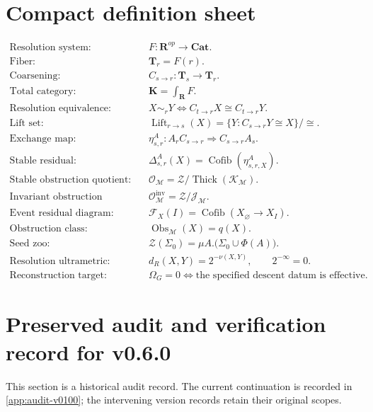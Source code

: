 \documentclass[11pt]{article}
\theoremstyle{definition}
\theoremstyle{remark}
\newcommand{\K}{\mathbf K}
\newcommand{\Rcat}{\mathbf R}
\newcommand{\Tcat}{\mathbf T}
\newcommand{\Cat}{\mathbf{Cat}}
\newcommand{\Lift}{\operatorname{Lift}}
\newcommand{\Cofib}{\operatorname{Cofib}}
\newcommand{\Obs}{\operatorname{Obs}}
\newcommand{\Zoo}{\mathcal Z}
\newcommand{\Seeds}{\Sigma}
\begin{document}
\appendix
{}
\section{Compact definition sheet}

\begin{align*}
\text{Resolution system:}\quad
&F:\Rcat^{op}\to\Cat.\\[0.4em]
\text{Fiber:}\quad
&\Tcat_r=F(r).\\[0.4em]
\text{Coarsening:}\quad
&C_{s\to r}:\Tcat_s\to\Tcat_r.\\[0.4em]
\text{Total category:}\quad
&\K=\int_{\Rcat}F.\\[0.4em]
\text{Resolution equivalence:}\quad
&X\sim_rY\iff C_{t\to r}X\cong C_{t\to r}Y.\\[0.4em]
\text{Lift set:}\quad
&\Lift_{r\to s}(X)=\{Y:C_{s\to r}Y\cong X\}/\cong.\\[0.4em]
\text{Exchange map:}\quad
&\eta^A_{s,r}:A_rC_{s\to r}\Rightarrow C_{s\to r}A_s.\\[0.4em]
\text{Stable residual:}\quad
&\Delta^A_{s,r}(X)=\Cofib(\eta^A_{s,r,X}).\\[0.4em]
\text{Stable obstruction quotient:}\quad
&\mathcal O_{\mathscr M}=\mathcal Z/\operatorname{Thick}(\mathcal K_{\mathscr M}).\\[0.4em]
\text{Invariant obstruction quotient:}\quad
&\mathcal O^{\mathrm{inv}}_{\mathscr M}=\mathcal Z/\mathcal J_{\mathscr M}.\\[0.4em]
\text{Event residual diagram:}\quad
&\mathcal F_X(I)=\Cofib(X_{\varnothing}\to X_I).\\[0.4em]
\text{Obstruction class:}\quad
&\Obs_{\mathscr M}(X)=q(X).\\[0.4em]
\text{Seed zoo:}\quad
&\Zoo(\Seeds_0)=\mu A.\bigl(\Seeds_0\cup\Phi(A)\bigr).\\[0.4em]
\text{Resolution ultrametric:}\quad
&d_R(X,Y)=2^{-\nu(X,Y)},\qquad 2^{-\infty}=0.\\[0.4em]
\text{Reconstruction target:}\quad
&\Omega_G=0\iff\text{the specified descent datum is effective}.
\end{align*}


\section{Preserved audit and verification record for v0.6.0}\label{app:audit}

This section is a historical audit record. The current continuation is recorded in \cref{app:audit-v0100}; the intervening version records retain their original scopes.
\end{document}
